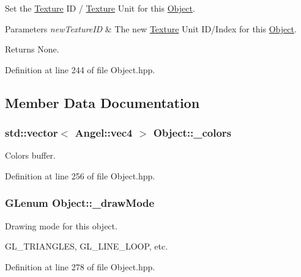 Set the \hyperlink{class_texture}{Texture} I\-D / \hyperlink{class_texture}{Texture} Unit for this \hyperlink{class_object}{Object}. 


\begin{DoxyParams}{Parameters}
{\em new\-Texture\-I\-D} & The new \hyperlink{class_texture}{Texture} Unit I\-D/\-Index for this \hyperlink{class_object}{Object}. \\
\hline
\end{DoxyParams}
\begin{DoxyReturn}{Returns}
None. 
\end{DoxyReturn}


Definition at line 244 of file Object.\-hpp.



\subsection{Member Data Documentation}
\hypertarget{class_object_a29a0e9959c490067db69378bf57a17ba}{
\subsubsection[{\-\_\-colors}]{\setlength{\rightskip}{0pt plus 5cm}std\-::vector$<$ {\bf Angel\-::vec4} $>$ Object\-::\-\_\-colors}}\label{class_object_a29a0e9959c490067db69378bf57a17ba}


Colors buffer. 



Definition at line 256 of file Object.\-hpp.

\hypertarget{class_object_ae8457eabfb89d55826142508013b56c0}{
\subsubsection[{\-\_\-draw\-Mode}]{\setlength{\rightskip}{0pt plus 5cm}G\-Lenum Object\-::\-\_\-draw\-Mode\hspace{0.3cm}{\ttfamily [protected]}}}\label{class_object_ae8457eabfb89d55826142508013b56c0}


Drawing mode for this object. 

G\-L\-\_\-\-T\-R\-I\-A\-N\-G\-L\-E\-S, G\-L\-\_\-\-L\-I\-N\-E\-\_\-\-L\-O\-O\-P, etc. 

Definition at line 278 of file Object.\-hpp.

